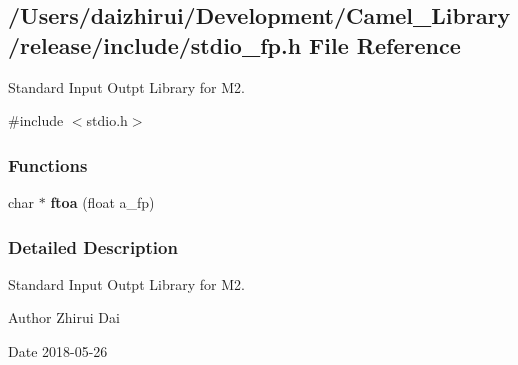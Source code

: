 \hypertarget{a00029}{}\subsection{/\+Users/daizhirui/\+Development/\+Camel\+\_\+\+Library/release/include/stdio\+\_\+fp.h File Reference}
\label{a00029}


Standard Input Outpt Library for M2.  


{\ttfamily \#include $<$stdio.\+h$>$}\newline
\subsubsection*{Functions}
\begin{DoxyCompactItemize}
\item 
\mbox{\label{a00029_ad84834e66c9593acc3052b51d8fd783e}} 
char $\ast$ {\bfseries ftoa} (float a\+\_\+fp)
\end{DoxyCompactItemize}


\subsubsection{Detailed Description}
Standard Input Outpt Library for M2. 

\begin{DoxyAuthor}{Author}
Zhirui Dai 
\end{DoxyAuthor}
\begin{DoxyDate}{Date}
2018-\/05-\/26 
\end{DoxyDate}
